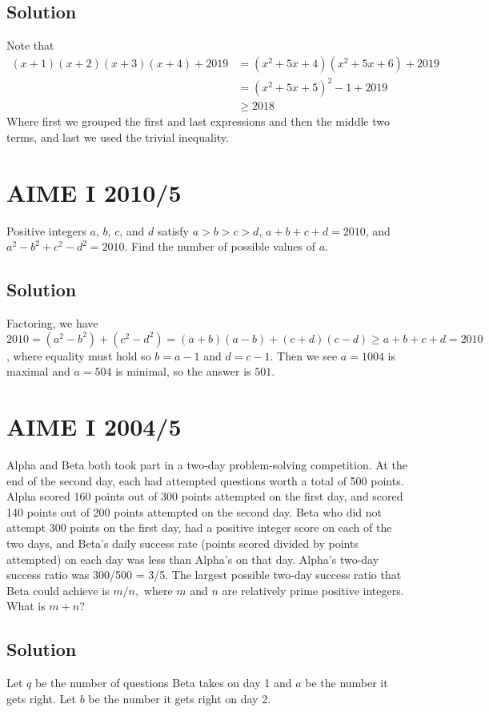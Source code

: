 \documentclass[blue,onecol]{shooting}
\begin{document}
\subsection{Solution}
Note that 
\begin{align*}
    (x+1)(x+2)(x+3)(x+4)+2019&=(x^2+5x+4)(x^2+5x+6)+2019\\&=(x^2+5x+5)^2-1+2019\\&\ge 2018
\end{align*}
Where first we grouped the first and last expressions and then the middle two terms, and last we used the trivial inequality. 
\section{AIME I 2010/5}
Positive integers $a$, $b$, $c$, and $d$ satisfy $a > b > c > d$, $a + b + c + d = 2010$, and $a^2 - b^2 + c^2 - d^2 = 2010$. Find the number of possible values of $a$.
\subsection{Solution}
Factoring, we have 
$2010 = (a^2 - b^2) + (c^2 - d^2) = (a + b)(a - b) + (c + d)(c - d) \ge a + b + c + d = 2010$, where equality must hold so $b = a - 1$ and $d = c - 1$. Then we see $a = 1004$ is maximal and $a = 504$ is minimal, so the answer is $\boxed{501}$.
\section{AIME I 2004/5}
Alpha and Beta both took part in a two-day problem-solving competition. At the end of the second day, each had attempted questions worth a total of 500 points. Alpha scored 160 points out of 300 points attempted on the first day, and scored 140 points out of 200 points attempted on the second day. Beta who did not attempt 300 points on the first day, had a positive integer score on each of the two days, and Beta's daily success rate (points scored divided by points attempted) on each day was less than Alpha's on that day. Alpha's two-day success ratio was 300/500 = 3/5. The largest possible two-day success ratio that Beta could achieve is $m/n,$ where $m$ and $n$ are relatively prime positive integers. What is $m+n$?
\subsection{Solution}
Let $q$ be the number of questions Beta takes on day 1 and $a$ be the number it gets right. Let $b$ be the number it gets right on day 2.
\end{document}

